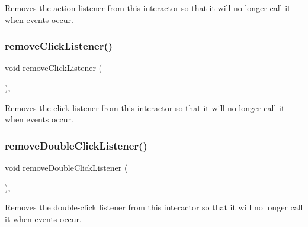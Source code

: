 Removes the action listener from this interactor so that it will no longer call it when events occur. 

\mbox{\label{classsgl_1_1GInteractor_ad39d0325cde6b97ebda4b9d7787c633b}} 
\subsubsection{\texorpdfstring{remove\+Click\+Listener()}{removeClickListener()}}
{\footnotesize\ttfamily void remove\+Click\+Listener (\begin{DoxyParamCaption}{ }\end{DoxyParamCaption})\hspace{0.3cm}{\ttfamily [virtual]}, {\ttfamily [inherited]}}



Removes the click listener from this interactor so that it will no longer call it when events occur. 

\mbox{\label{classsgl_1_1GInteractor_aa4250907e4cdd77349c04f0cf5cdd3d3}} 
\subsubsection{\texorpdfstring{remove\+Double\+Click\+Listener()}{removeDoubleClickListener()}}
{\footnotesize\ttfamily void remove\+Double\+Click\+Listener (\begin{DoxyParamCaption}{ }\end{DoxyParamCaption})\hspace{0.3cm}{\ttfamily [virtual]}, {\ttfamily [inherited]}}



Removes the double-\/click listener from this interactor so that it will no longer call it when events occur. 

\mbox{\label{classsgl_1_1GObservable_acbcf1ed3a851ad8a3c17ef38d86b481d}} 
